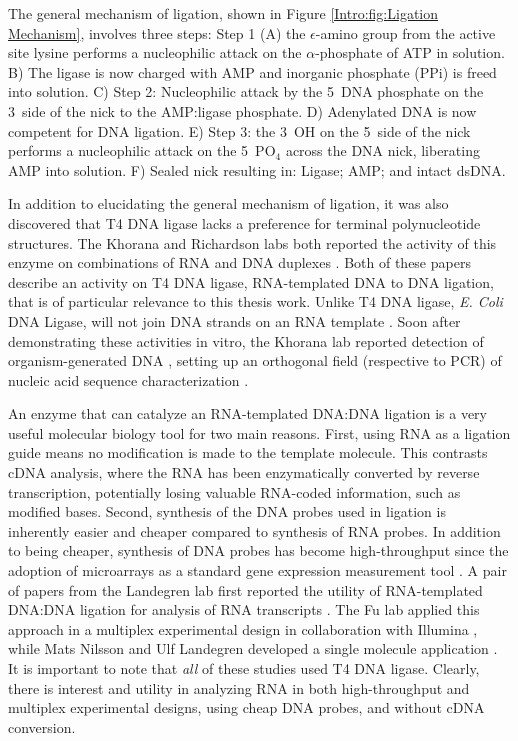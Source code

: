    The general mechanism of ligation, shown in Figure \ref{Intro:fig:Ligation Mechanism}, involves three steps: Step 1 (A) the $\epsilon$-amino group from the active site lysine performs a nucleophilic attack on the $\alpha$-phosphate of ATP in solution. B) The ligase is now charged with AMP and inorganic phosphate (PPi) is freed into solution. C) Step 2: Nucleophilic attack by the 5\textprime~DNA phosphate on the 3\textprime~side of the nick to the AMP:ligase phosphate. D) Adenylated DNA is now competent for DNA ligation. E) Step 3: the 3\textprime~OH on the 5\textprime~side of the nick performs a nucleophilic attack on the 5\textprime~PO$_{4}$ across the DNA nick, liberating AMP into solution. F) Sealed nick resulting in: Ligase; AMP; and intact dsDNA.

    In addition to elucidating the general mechanism of ligation, it was also discovered that T4 DNA ligase lacks a preference for terminal polynucleotide structures. The Khorana and Richardson labs both reported the activity of this enzyme on combinations of RNA and DNA duplexes \citep{Fareed1971, Kleppe1970b}. Both of these papers describe an activity on T4 DNA ligase, RNA-templated DNA to DNA ligation, that is of particular relevance to this thesis work. Unlike T4 DNA ligase, \textit{E. Coli} DNA Ligase, will not join DNA strands on an RNA template \citep{Bullard2006}. Soon after demonstrating these activities in vitro, the Khorana lab reported detection of organism-generated DNA \citep{Besmer1972b}, setting up an orthogonal field (respective to PCR) of nucleic acid sequence characterization \citep{Conze2009c}.

    An enzyme that can catalyze an RNA-templated DNA:DNA ligation is a very useful molecular biology tool for two main reasons. First, using RNA as a ligation guide means no modification is made to the template molecule. This contrasts cDNA analysis, where the RNA has been enzymatically converted by reverse transcription, potentially losing valuable RNA-coded information, such as modified bases. Second, synthesis of the DNA probes used in ligation is inherently easier and cheaper compared to synthesis of RNA probes. In addition to being cheaper, synthesis of DNA probes has become high-throughput since the adoption of microarrays as a standard gene expression measurement tool \citep{Schena1995a}. A pair of papers from the Landegren lab first reported the utility of RNA-templated DNA:DNA ligation for analysis of RNA transcripts \citep{Nilsson2000,Nilsson2001}. The Fu lab applied this approach in a multiplex experimental design in collaboration with Illumina \citep{Li2012c,Yeakley2002}, while Mats Nilsson and Ulf Landegren developed a single molecule application \citep{Conze2010}. It is important to note that \textit{all} of these studies used T4 DNA ligase. Clearly, there is interest and utility in analyzing RNA in both high-throughput and multiplex experimental designs, using cheap DNA probes, and without cDNA conversion.

